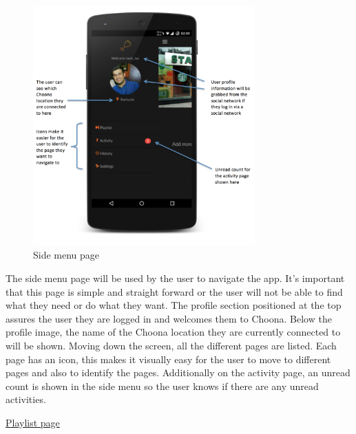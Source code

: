 \noindent
\begin{figure}[h!]
\centering
\includegraphics[width=0.76\textwidth]{./img/sidemenuannotated.png}
\caption{Side menu page}
\label{fig:sidemenu}
\end{figure}

The side menu page will be used by the user to navigate the app. It's important that this page is simple and straight forward or the user will not be able to find what they need or do what they want. The profile section positioned at the top assures the user they are logged in and welcomes them to Choona.  Below the profile image, the name of the Choona location they are currently connected to will be shown. Moving down the screen, all the different pages are listed. Each page has an icon, this makes it visually easy for the user to move to different pages and also to identify the pages. Additionally on the activity page, an unread count is shown in the side menu so the user knows if there are any unread activities.\\

\clearpage

\noindent\underline{Playlist page}\newline

